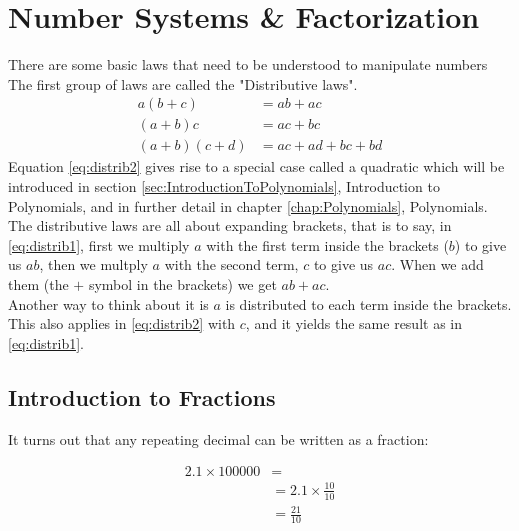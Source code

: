 \chapter{Number Systems \& Factorization}
\label{sec:NumberSystemsAndFactorization}
There are some basic laws that need to be understood to manipulate numbers
The first group of laws are called the "Distributive laws".
\begin{align}
      a(b+c) & = ab + ac \label{eq:distrib0} \\
      (a+b)c & = ac + bc \label{eq:distrib1} \\
  (a+b)(c+d) & = ac + ad + bc + bd \label{eq:distrib2}
\end{align}
Equation \ref{eq:distrib2} gives rise to a special case called a quadratic
which will be introduced in section \ref{sec:IntroductionToPolynomials},
Introduction to Polynomials, and in further detail in chapter
\ref{chap:Polynomials}, Polynomials. 
\\
The distributive laws are all about expanding brackets, that is to say, in
\ref{eq:distrib1}, first we multiply $a$ with the first term inside the
brackets ($b$) to give us $ab$, then we multply $a$ with the second term, $c$
to give us $ac$. When we add them (the $+$ symbol in the brackets) we get
$ab + ac$.
\\
Another way to think about it is $a$ is distributed to each term inside the
brackets. This also applies in \ref{eq:distrib2} with $c$, and it yields the 
same result as in \ref{eq:distrib1}.

\section{Introduction to Fractions}
\label{sec:IntroductionToFractions}
It turns out that any repeating decimal can be written as a fraction:

\begin{align}
  2.1 \times 100000 & = \\
    & = 2.1 \times \frac{10}{10} \\
    & = \frac{21}{10} \\
\end{align}

